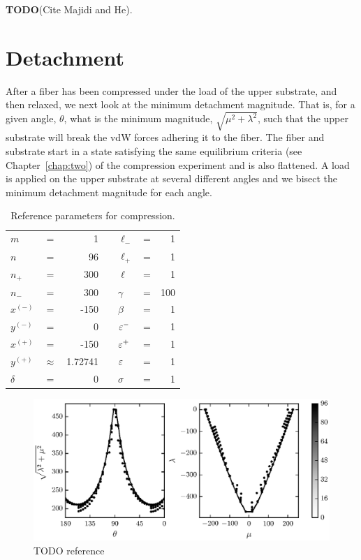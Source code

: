 \textbf{TODO}(Cite Majidi and He).

\section{Detachment} \label{ch:detachment}

After a fiber has been compressed under the load of the upper substrate, and then relaxed, we next look at the minimum detachment magnitude. That is, for a given angle, $\theta$, what is the minimum magnitude, $\sqrt{\mu^2 + \lambda^2}$, such that the upper substrate will break the vdW forces adhering it to the fiber. The fiber and substrate start in a state satisfying the same equilibrium criteria (see Chapter~\ref{chap:two}) of the compression experiment and is also flattened. A load is applied on the upper substrate at several different angles and we bisect the minimum detachment magnitude for each angle.

	\begin{table}
		\centering
		\caption{Reference parameters for compression. \label{table:detachment_reference}}
		\begin{tabular}{lcrclcr}
			$m$ & = & 1 & \hspace{1in} & $\ell_-$ & = & 1 \\
			$n$ & = & 96 & & $\ell_+$ & = & 1 \\
			$n_+$ & = & 300 & & $\ell$ & = & 1 \\
			$n_-$ & = & 300 & & $\gamma$ & = & 100 \\
			$x^{(-)}$ & = & -150 & & $\beta$ & = & 1 \\
			$y^{(-)}$ & = & 0 & & $\varepsilon^-$ & = & 1 \\
			$x^{(+)}$ & = & -150 & & $\varepsilon^+$ & = & 1 \\
			$y^{(+)}$ & $\approx$ & 1.72741 & & $\varepsilon$ & = & 1 \\
			$\delta$ & = & 0 & & $\sigma$ & = & 1
		\end{tabular}
	\end{table}
	
	\begin{figure}
		\begin{center}
			\includegraphics{./fig/ch3/pull/ref/grid.eps}
		\end{center}		
		\caption{ TODO reference
		\label{fig:PullGrid}}
	\end{figure}

